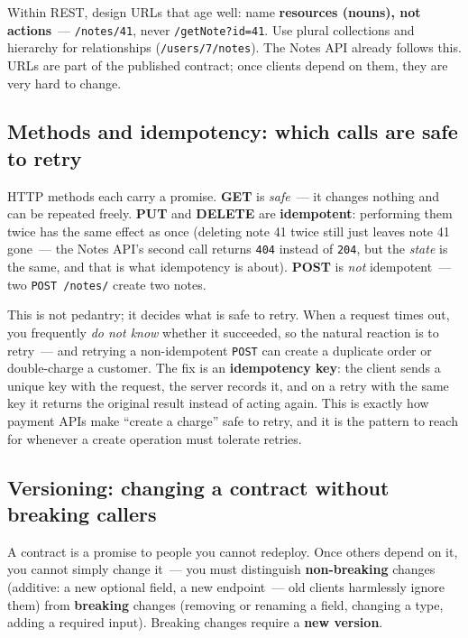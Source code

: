Within REST, design URLs that age well: name \textbf{resources (nouns), not actions}~--- \texttt{/notes/41}, never \texttt{/getNote?id=41}. Use plural collections and hierarchy for relationships (\texttt{/users/7/notes}). The Notes API already follows this. URLs are part of the published contract; once clients depend on them, they are very hard to change.

\subsection*{Methods and idempotency: which calls are safe to retry}\label{34-response-handling:methods-and-idempotency-which-calls-are-safe-to-retry}

HTTP methods each carry a promise. \textbf{GET} is \emph{safe}~--- it changes nothing and can be repeated freely. \textbf{PUT} and \textbf{DELETE} are \textbf{idempotent}: performing them twice has the same effect as once (deleting note 41 twice still just leaves note 41 gone~--- the Notes API's second call returns \texttt{404} instead of \texttt{204}, but the \emph{state} is the same, and that is what idempotency is about). \textbf{POST} is \emph{not} idempotent~--- two \texttt{POST\ /notes/} create two notes.

This is not pedantry; it decides what is safe to retry. When a request times out, you frequently \emph{do not know} whether it succeeded, so the natural reaction is to retry~--- and retrying a non-idempotent \texttt{POST} can create a duplicate order or double-charge a customer. The fix is an \textbf{idempotency key}: the client sends a unique key with the request, the server records it, and on a retry with the same key it returns the original result instead of acting again. This is exactly how payment APIs make ``create a charge'' safe to retry, and it is the pattern to reach for whenever a create operation must tolerate retries.

\subsection*{Versioning: changing a contract without breaking callers}\label{34-response-handling:versioning-changing-a-contract-without-breaking-callers}

A contract is a promise to people you cannot redeploy. Once others depend on it, you cannot simply change it~--- you must distinguish \textbf{non-breaking} changes (additive: a new optional field, a new endpoint~--- old clients harmlessly ignore them) from \textbf{breaking} changes (removing or renaming a field, changing a type, adding a required input). Breaking changes require a \textbf{new version}.

